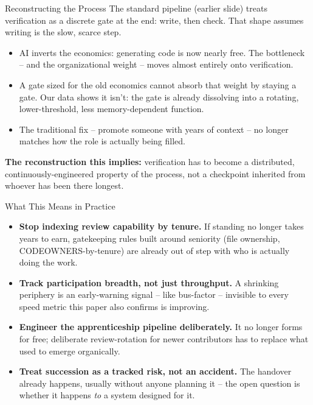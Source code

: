 \begin{frame}{Reconstructing the Process}
The standard pipeline (earlier slide) treats verification as a
discrete gate at the end: write, then check. That shape assumes
writing is the slow, scarce step.
\begin{itemize}
  \item AI inverts the economics: generating code is now nearly free.
        The bottleneck -- and the organizational weight -- moves
        almost entirely onto verification.
  \item A gate sized for the old economics cannot absorb that weight
        by staying a gate. Our data shows it isn't: the gate is
        already dissolving into a rotating, lower-threshold, less
        memory-dependent function.
  \item The traditional fix -- promote someone with years of context
        -- no longer matches how the role is actually being filled.
\end{itemize}
\vspace{0.3em}
\textbf{The reconstruction this implies:} verification has to become a
distributed, continuously-engineered property of the process, not a
checkpoint inherited from whoever has been there longest.
\end{frame}

\begin{frame}{What This Means in Practice}
\begin{itemize}
  \item \textbf{Stop indexing review capability by tenure.} If
        standing no longer takes years to earn, gatekeeping rules
        built around seniority (file ownership, CODEOWNERS-by-tenure)
        are already out of step with who is actually doing the work.
  \item \textbf{Track participation breadth, not just throughput.} A
        shrinking periphery is an early-warning signal -- like
        bus-factor -- invisible to every speed metric this paper also
        confirms is improving.
  \item \textbf{Engineer the apprenticeship pipeline deliberately.} It
        no longer forms for free; deliberate review-rotation for newer
        contributors has to replace what used to emerge organically.
  \item \textbf{Treat succession as a tracked risk, not an accident.}
        The handover already happens, usually without anyone planning
        it -- the open question is whether it happens \emph{to} a
        system designed for it.
\end{itemize}
\end{frame}

